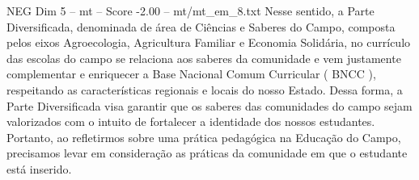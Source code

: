 \begin{textsample}{NEG Dim 5 – mt – Score -2.00 – mt/mt\_em\_8.txt}
Nesse sentido, a Parte Diversificada, denominada de área de Ciências e Saberes do Campo, composta pelos eixos Agroecologia, Agricultura Familiar e Economia Solidária, no currículo das escolas do campo se relaciona aos saberes da comunidade e vem justamente complementar e enriquecer a Base Nacional Comum Curricular ( BNCC ), respeitando as características regionais e locais do nosso Estado.
Dessa forma, a Parte Diversificada visa garantir que os saberes das comunidades do campo sejam valorizados com o intuito de fortalecer a identidade dos nossos estudantes.
Portanto, ao refletirmos sobre uma prática pedagógica na Educação do Campo, precisamos levar em consideração as práticas da comunidade em que o estudante está inserido.

\end{textsample}
